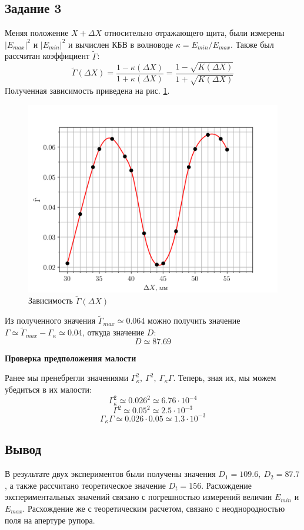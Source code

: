 \subsection{Задание 3}
Меняя положение $X +\Delta X$ относительно отражающего щита, были измерены $|E_{max}|^2$ и $|E_{min}|^2$ и вычислен
КБВ в волноводе $\kappa = E_{min} / E_{max}$. Также был рассчитан коэффициент $\tilde{\Gamma} $:
\begin{equation}
    \tilde{\Gamma}(\Delta X)= \frac{1-\kappa (\Delta X)}{1+\kappa (\Delta X)} = \frac{1-\sqrt{K(\Delta X)}}{1+\sqrt{K(\Delta X)}} 
\end{equation}
Полученная зависимость приведена на рис. \ref{fig:exp:3}.
\begin{figure}[h!]
    \centering
    \includegraphics[width = 0.9\linewidth]{graphs/data33.png}
    \caption{Зависимость $\tilde{\Gamma}(\Delta X)$ }
    \label{fig:exp:3}
\end{figure}

Из полученного значения $\tilde{\Gamma}_{max} \simeq 0.064$ можно получить значение $\Gamma \simeq \tilde{\Gamma}_{max} -
\Gamma_{\kappa} \simeq 0.04$, откуда значение $D$: $$D \simeq 87.69$$ 

\textbf{Проверка предположения малости}

Ранее мы пренебрегли значениями $ \Gamma_{\kappa}^2,~ \Gamma^2,~ \Gamma_{\kappa} \Gamma $. Теперь, зная их, мы
можем убедиться в их малости: 
$$ \Gamma_{\kappa}^2 \simeq 0.026^2 \simeq 6.76 \cdot 10^{-4} $$
$$\Gamma^2 \simeq 0.05^2 \simeq 2.5 \cdot 10^{-3} $$
$$\Gamma_{\kappa} \Gamma \simeq 0.026 \cdot 0.05 \simeq 1.3 \cdot 10^{-3}$$


\subsection{Вывод}
В результате двух экспериментов были получены значения $D_1 = 109.6,~ D_2 = 87.7$, а также рассчитано теоретическое
значение $D_t = 156$. Расхождение экспериментальных значений связано с погрешностью измерений величин $E_{min}$ и
$E_{max}$. Расхождение же с теоретическим расчетом, связано с неоднородностью поля на апертуре рупора.
 
